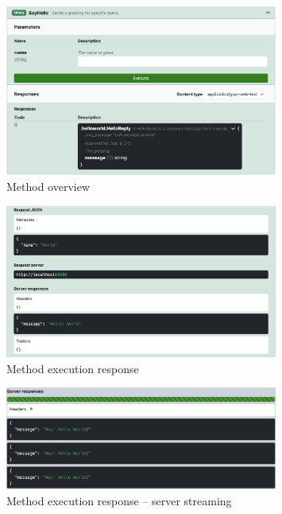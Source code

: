 \begin{figure}[!htb]
    \centering
    \captionsetup{justification=centering}
    \includegraphics[width=0.8\textwidth]{images/implementation/screenshots/method}
    \caption{Method overview}
    \label{fig:implementation-screenshots-method}
\end{figure}

\begin{figure}[!htb]
    \centering
    \captionsetup{justification=centering}
    \includegraphics[width=0.8\textwidth]{images/implementation/screenshots/response}
    \caption{Method execution response}
    \label{fig:implementation-screenshots-response}
\end{figure}


\begin{figure}[!htb]
    \centering
    \captionsetup{justification=centering}
    \includegraphics[width=0.8\textwidth]{images/implementation/screenshots/responses-streaming}
    \caption{Method execution response -- server streaming}
    \label{fig:implementation-screenshots-responses-streaming}
\end{figure}


